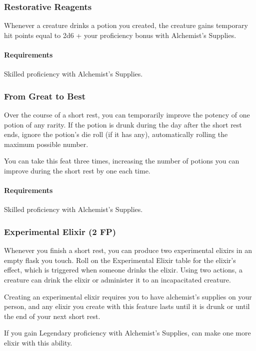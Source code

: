 \subsubsection{Restorative Reagents} \label{feat::restorativereagents}
    Whenever a creature drinks a potion you created, the creature gains temporary hit points equal to 2d6 + your proficiency bonus with Alchemist's Supplies.
    \paragraph{Requirements} Skilled proficiency with Alchemist's Supplies.
\subsubsection{From Great to Best} \label{feat::fromgreattobest}
    Over the course of a short rest, you can temporarily improve the potency of one potion of any rarity.
    If the potion is drunk during the day after the short rest ends, ignore the potion's die roll (if it has any), automatically rolling the maximum possible number.

    You can take this feat three times, increasing the number of potions you can improve during the short rest by one each time.
    \paragraph{Requirements} Skilled proficiency with Alchemist's Supplies.
\subsubsection{Experimental Elixir (2 FP)} \label{feat::experimentalelixir}
    Whenever you finish a short rest, you can produce two experimental elixirs in an empty flask you touch.
    Roll on the Experimental Elixir table for the elixir's effect, which is triggered when someone drinks the elixir.
    Using two actions, a creature can drink the elixir or administer it to an incapacitated creature.

    Creating an experimental elixir requires you to have alchemist's supplies on your person, and any elixir you create with this feature lasts until it is drunk or until the end of your next short rest.

    If you gain Legendary proficiency with Alchemist's Supplies, can make one more elixir with this ability.


